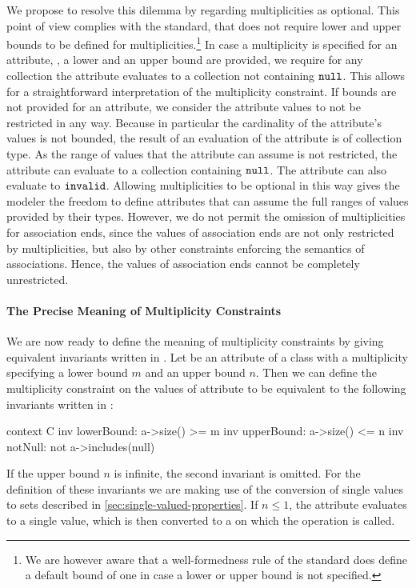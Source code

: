 We propose to resolve this dilemma by regarding multiplicities as optional. This
point of view complies with the \UML standard, that does not require lower and
upper bounds to be defined for multiplicities.\footnote{We are however aware
  that a well-formedness rule of the \UML standard does define a default bound
  of one in case a lower or upper bound is not specified.} In case a
multiplicity is specified for an attribute, \ie, a lower and an upper bound
are provided, we require for any collection the attribute evaluates to 
a collection not containing $\mathtt{null}$. This allows for a straightforward 
interpretation of
the multiplicity constraint. If bounds are not provided for an attribute, we
consider the attribute values to not be restricted in any way. Because in
particular the cardinality of the attribute's values is not bounded, the result
of an evaluation of the attribute is of collection type. As the range of values
that the attribute can assume is not restricted, the attribute can evaluate to a
collection containing $\mathtt{null}$. The attribute can also evaluate to
$\mathtt{invalid}$. Allowing multiplicities to be optional in this way gives
the modeler the freedom to define attributes that can assume the full ranges of
values provided by their types. However, we do not permit the omission of
multiplicities for association ends, since the values of association ends are
not only restricted by multiplicities, but also by other constraints enforcing
the semantics of associations. Hence, the values of association ends cannot be
completely unrestricted.

\paragraph{The Precise Meaning of Multiplicity Constraints}
We are now ready to define the meaning of multiplicity constraints by giving
equivalent invariants written in \OCL\@. Let  be an attribute of a
class  with a multiplicity specifying a lower bound $m$ and an
upper bound $n$. Then we can define the multiplicity constraint on the values of
attribute  to be equivalent to the following invariants written in
\OCL:
\begin{ocl}
context C inv lowerBound: a->size() >= m
          inv upperBound: a->size() <= n
          inv notNull: not a->includes(null)
\end{ocl}
If the upper bound $n$ is infinite, the second invariant is omitted. For the
definition of these invariants we are making use of the conversion of single
values to sets described in \autoref{sec:single-valued-properties}. If $n
\leq 1$, the attribute  evaluates to a single value, which is then
converted to a  on which the  operation is
called.

